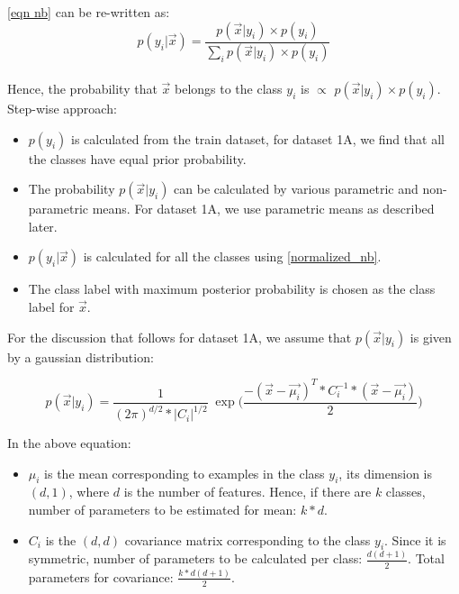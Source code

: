 \documentclass[11pt,a4paper]{article}
\newcommand{\noi}{\noindent}
\begin{document}
\noi
\autoref{eqn nb} can be re-written as:
\begin{equation} \label{normalized_nb}
    p(y_{i}|\vec{x})=\frac{p(\vec{x}|y_{i}) \times p(y_{i})}{\sum_{i}p(\vec{x}|y_{i}) \times p(y_{i})}
\end{equation}\\

\noi
Hence, the probability that $\vec{x}$ belongs to the class $y_{i}$ is $\propto$ $p(\vec{x}|y_{i}) \times p(y_{i})$.\\

\noi
Step-wise approach:
\begin{itemize}
    \itemsep0em
    \item $p(y_{i})$ is calculated from the train dataset, for dataset 1A, we find that all the classes have equal prior probability.
    \item The probability $p(\vec{x}|y_{i})$ can be calculated by various parametric and non-parametric means. For dataset 1A, we use parametric means as described later.
    \item $p(y_{i}|\vec{x})$ is calculated for all the classes using \autoref{normalized_nb}.
    \item The class label with maximum posterior probability is chosen as the class label for $\vec{x}$.
\end{itemize}

\noi
For the discussion that follows for dataset 1A, we assume that $p(\vec{x}|y_{i})$ is given by a gaussian distribution:

\begin{equation}
\label{gaussian}
    p(\vec{x}|y_{i})=\frac{1}{(2\pi)^{d/2}*|C_{i}|^{1/2}}\;\exp{\Big(\frac{-(\vec{x}-\vec{\mu_{i}})^{T}*C_{i}^{-1}*(\vec{x}-\vec{\mu_{i}})}{2}}\Big)
\end{equation}

\noi
In the above equation: 

\begin{itemize}
    \item $\mu_{i}$ is the mean corresponding to examples in the class $y_{i}$, its dimension is $(d,1)$, where $d$ is the number of features. Hence, if there are $k$ classes, number of parameters to be estimated for mean: $k*d$.
    \item $C_{i}$ is the $(d,d)$ covariance matrix corresponding to the class $y_{i}$. Since it is symmetric, number of parameters to be calculated per class: $\frac{d(d+1)}{2}$. Total parameters for covariance: $\frac{k*d(d+1)}{2}$.
\end{itemize}
\end{document}
